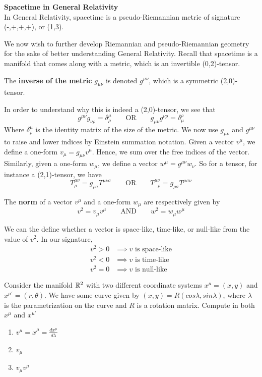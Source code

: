 \documentclass{article}
\begin{document}
 			\begin{exmp}
 				\textbf{Spacetime in General Relativity}\\
 				In General Relativity, spacetime is a pseudo-Riemannian metric of signature (-,+,+,+), or (1,3).
 			\end{exmp}
 		
 			We now wish to further develop Riemannian and pseudo-Riemannian geometry for the sake of better understanding General Relativity. Recall that spacetime is a manifold that comes along with a metric, which is an invertible (0,2)-tensor.
 			\begin{defn}
 				The \textbf{inverse of the metric} $g_{\mu\nu}$ is denoted $g^{\mu\nu}$, which is a symmetric (2,0)-tensor.
 			\end{defn} \noindent
 			In order to understand why this is indeed a (2,0)-tensor, we see that
 			\begin{equation}
 				\label{eq:MetricIdentity}
 				\boxed{g^{\mu\nu}g_{\nu\rho} = \delta_\rho^\mu} \quad\quad \text{OR} \quad\quad \boxed{g_{\mu\nu}g^{\nu\rho} = \delta_\mu^\rho}
 			\end{equation}
 			Where $\delta_\rho^\mu$ is the identity matrix of the size of the metric. We now use $g_{\mu\nu}$ and $g^{\mu\nu}$ to raise and lower indices by Einstein summation notation. Given a vector $v^\mu$, we define a one-form $v_\mu = g_{\mu\nu}v^\mu$. Hence, we sum over the free indices of the vector. Similarly, given a one-form $w_\mu$, we define a vector $w^\mu = g^{\mu\nu} w_\nu$. So for a tensor, for instance a (2,1)-tensor, we have
 			$$T^{\mu\nu}_{\rho} = g_{\rho \sigma} T^{\mu\nu\sigma} \quad\quad \text{OR} \quad\quad T^{\mu\nu}_{\,\,\,\,\rho} = g_{\rho\sigma} T^{\mu\sigma\nu}$$
 			\begin{defn}
 				The \textbf{norm} of a vector $v^\mu$ and a one-form $w_\mu$ are respectively given by
 				$$ v^2 = v_\mu v^\mu \quad \quad \text{AND} \quad \quad w^2 = w_\mu w^\mu$$
 			\end{defn} \noindent
 			We can the define whether a vector is space-like, time-like, or null-like from the value of $v^2$. In our signature, 
 			\begin{align*}
 				v^2 > 0 &\implies v \text{ is space-like}\\
 				v^2 < 0 &\implies v \text{ is time-like}\\
 				v^2 = 0 &\implies v \text{ is null-like}
 			\end{align*}
 		\pagebreak
 			\begin{exe}
 				Consider the manifold $\mathbb{R}^2$ with two different coordinate systems $x^\mu = (x,y)$ and $x^{\mu'} = (r, \theta)$. We have some curve given by $(x,y) = R (cos\lambda, sin \lambda)$, where $\lambda$ is the parametrization on the curve and $R$ is a rotation matrix. Compute in both $x^\mu$ and $x^{\mu'}$
 				\begin{enumerate}
 					\item $v^{\mu} = \dot{x}^\mu = \frac{dx^\mu}{d\lambda}$
 					\item $v_\mu$
 					\item $v_\mu v^\mu$
 				\end{enumerate}
 			\end{exe}
 			
\end{document}
